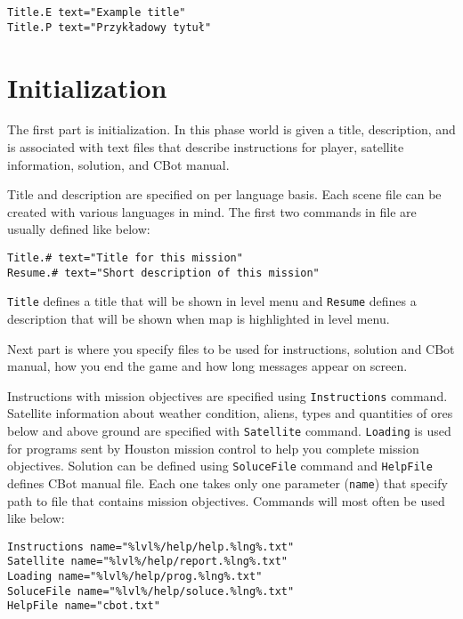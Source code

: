 \begin{verbatim}
Title.E text="Example title"
Title.P text="Przykładowy tytuł"
\end{verbatim}


\section{Initialization}

The first part is initialization. In this phase world is given a title, description, and is associated with text files that describe instructions for player, satellite information, solution, and CBot manual.

Title and description are specified on per language basis. Each scene file can be created with various languages in mind. The first two commands in file are usually defined like below:

\begin{verbatim}
Title.# text="Title for this mission"
Resume.# text="Short description of this mission"
\end{verbatim}

\verb|Title| defines a title that will be shown in level menu and \verb|Resume| defines a description that will be shown when map is highlighted in level menu.

Next part is where you specify files to be used for instructions, solution and CBot manual, how you end the game and how long messages appear on screen.

Instructions with mission objectives are specified using \texttt{Instructions} command. Satellite information about weather condition, aliens, types and quantities of ores below and above ground are specified with \verb|Satellite| command. \verb|Loading| is used for programs sent by Houston mission control to help you complete mission objectives. Solution can be defined using \texttt{SoluceFile} command and \texttt{HelpFile} defines CBot manual file. Each one takes only one parameter (\texttt{name}) that specify path to file that contains mission objectives. Commands will most often be used like below:

\begin{verbatim}
Instructions name="%lvl%/help/help.%lng%.txt"
Satellite name="%lvl%/help/report.%lng%.txt"
Loading name="%lvl%/help/prog.%lng%.txt"
SoluceFile name="%lvl%/help/soluce.%lng%.txt"
HelpFile name="cbot.txt"
\end{verbatim}

